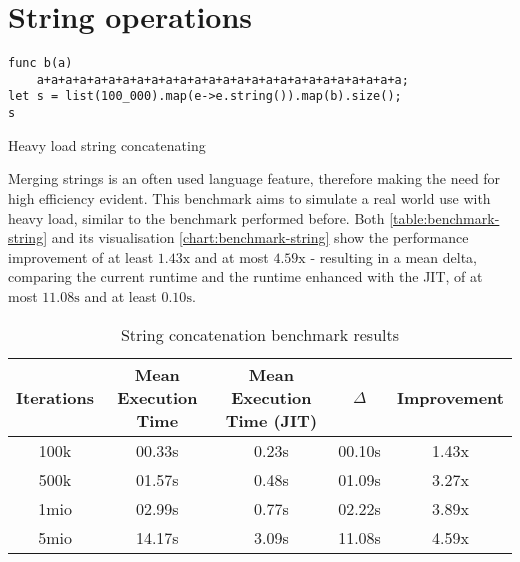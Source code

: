 \section{String operations}

\begin{listing}[H]
    \begin{verbatim}
func b(a)
    a+a+a+a+a+a+a+a+a+a+a+a+a+a+a+a+a+a+a+a+a+a+a+a+a+a;
let s = list(100_000).map(e->e.string()).map(b).size();
s
    \end{verbatim}
    \caption{Heavy load string concatenating}
    \label{code:benchmark-string}
\end{listing}

Merging strings is an often used language feature, therefore making the need
for high efficiency evident. This benchmark aims to simulate a real world use
with heavy load, similar to the benchmark performed before. Both
\autoref{table:benchmark-string} and its visualisation
\autoref{chart:benchmark-string} show the performance improvement of at least
$1.43\textrm{x}$ and at most $4.59\textrm{x}$ - resulting in a mean delta,
comparing the current runtime and the runtime enhanced with the JIT, of at most
$11.08\textrm{s}$ and at least $0.10\textrm{s}$.

\begin{table}[H]
    \centering
    \begin{tabular}{c|c|c|c|c}
        Iterations & Mean Execution Time & Mean Execution Time (JIT) & $\Delta$ & Improvement \\ 
        \hline
        100k & 00.33s & 0.23s & 00.10s & 1.43x  \\
        500k & 01.57s & 0.48s & 01.09s & 3.27x  \\ 
        1mio & 02.99s & 0.77s & 02.22s & 3.89x  \\ 
        5mio & 14.17s & 3.09s & 11.08s & 4.59x\\ 
    \end{tabular}
    \caption{String concatenation benchmark results}
    \label{table:benchmark-string}
\end{table}

